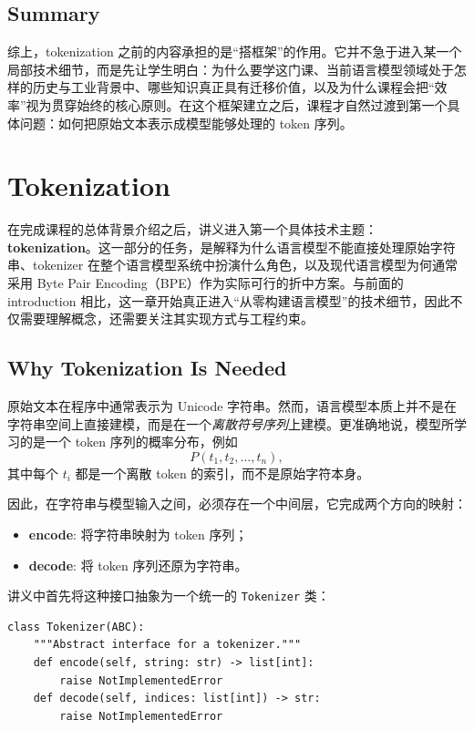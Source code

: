 \documentclass[a4paper,UTF8]{article}
\numberwithin{equation}{section}
\begin{document}
\subsection{Summary}

综上，tokenization 之前的内容承担的是“搭框架”的作用。它并不急于进入某一个局部技术细节，而是先让学生明白：为什么要学这门课、当前语言模型领域处于怎样的历史与工业背景中、哪些知识真正具有迁移价值，以及为什么课程会把“效率”视为贯穿始终的核心原则。在这个框架建立之后，课程才自然过渡到第一个具体问题：如何把原始文本表示成模型能够处理的 token 序列。


\section{Tokenization}

在完成课程的总体背景介绍之后，讲义进入第一个具体技术主题：\textbf{tokenization}。这一部分的任务，是解释为什么语言模型不能直接处理原始字符串、tokenizer 在整个语言模型系统中扮演什么角色，以及现代语言模型为何通常采用 Byte Pair Encoding（BPE）作为实际可行的折中方案。与前面的 introduction 相比，这一章开始真正进入“从零构建语言模型”的技术细节，因此不仅需要理解概念，还需要关注其实现方式与工程约束。

\subsection{Why Tokenization Is Needed}

原始文本在程序中通常表示为 Unicode 字符串。然而，语言模型本质上并不是在字符串空间上直接建模，而是在一个\emph{离散符号序列}上建模。更准确地说，模型所学习的是一个 token 序列的概率分布，例如
\[
P(t_1, t_2, \dots, t_n),
\]
其中每个 $t_i$ 都是一个离散 token 的索引，而不是原始字符本身。

因此，在字符串与模型输入之间，必须存在一个中间层，它完成两个方向的映射：
\begin{itemize}
    \item \textbf{encode}: 将字符串映射为 token 序列；
    \item \textbf{decode}: 将 token 序列还原为字符串。
\end{itemize}
讲义中首先将这种接口抽象为一个统一的 \verb|Tokenizer| 类：

\begin{verbatim}
class Tokenizer(ABC):
    """Abstract interface for a tokenizer."""
    def encode(self, string: str) -> list[int]:
        raise NotImplementedError
    def decode(self, indices: list[int]) -> str:
        raise NotImplementedError
\end{verbatim}
\end{document}
